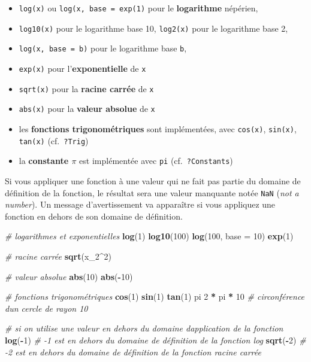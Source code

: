 \documentclass[
]{book}
\newenvironment{Shaded}{\begin{snugshade}}{\end{snugshade}}
\newcommand{\AttributeTok}[1]{\textcolor[rgb]{0.13,0.29,0.53}{#1}}
\newcommand{\CommentTok}[1]{\textcolor[rgb]{0.56,0.35,0.01}{\textit{#1}}}
\newcommand{\DecValTok}[1]{\textcolor[rgb]{0.00,0.00,0.81}{#1}}
\newcommand{\FunctionTok}[1]{\textcolor[rgb]{0.13,0.29,0.53}{\textbf{#1}}}
\newcommand{\NormalTok}[1]{#1}
\newcommand{\SpecialCharTok}[1]{\textcolor[rgb]{0.81,0.36,0.00}{\textbf{#1}}}
\providecommand{\tightlist}{%
  \setlength{\itemsep}{0pt}\setlength{\parskip}{0pt}}
\begin{document}
\begin{itemize}
\tightlist
\item
  \texttt{log(x)} ou \texttt{log(x,\ base\ =\ exp(1)} pour le \textbf{logarithme} népérien,
\item
  \texttt{log10(x)} pour le logarithme base 10, \texttt{log2(x)} pour le logarithme base 2,
\item
  \texttt{log(x,\ base\ =\ b)} pour le logarithme base \texttt{b},
\item
  \texttt{exp(x)} pour l'\textbf{exponentielle} de \texttt{x}
\item
  \texttt{sqrt(x)} pour la \textbf{racine carrée} de \texttt{x}
\item
  \texttt{abs(x)} pour la \textbf{valeur absolue} de \texttt{x}
\item
  les \textbf{fonctions trigonométriques} sont implémentées, avec \texttt{cos(x)}, \texttt{sin(x)}, \texttt{tan(x)} (cf.~\texttt{?Trig})
\item
  la \textbf{constante \(\pi\)} est implémentée avec \texttt{pi} (cf.~\texttt{?Constants})
\end{itemize}

Si vous appliquer une fonction à une valeur qui ne fait pas partie du domaine de définition de la fonction, le résultat sera une valeur manquante notée \texttt{NaN} (\emph{not a number}). Un message d'avertissement va apparaître si vous appliquez une fonction en dehors de son domaine de définition.

\begin{Shaded}
\begin{Highlighting}[]
\CommentTok{\# logarithmes et exponentielles}
\FunctionTok{log}\NormalTok{(}\DecValTok{1}\NormalTok{)}
\FunctionTok{log10}\NormalTok{(}\DecValTok{100}\NormalTok{)}
\FunctionTok{log}\NormalTok{(}\DecValTok{100}\NormalTok{, }\AttributeTok{base =} \DecValTok{10}\NormalTok{)}
\FunctionTok{exp}\NormalTok{(}\DecValTok{1}\NormalTok{)}

\CommentTok{\# racine carrée}
\FunctionTok{sqrt}\NormalTok{(x\_2}\SpecialCharTok{\^{}}\DecValTok{2}\NormalTok{)}

\CommentTok{\# valeur absolue}
\FunctionTok{abs}\NormalTok{(}\DecValTok{10}\NormalTok{)}
\FunctionTok{abs}\NormalTok{(}\SpecialCharTok{{-}}\DecValTok{10}\NormalTok{)}

\CommentTok{\# fonctions trigonométriques}
\FunctionTok{cos}\NormalTok{(}\DecValTok{1}\NormalTok{)}
\FunctionTok{sin}\NormalTok{(}\DecValTok{1}\NormalTok{)}
\FunctionTok{tan}\NormalTok{(}\DecValTok{1}\NormalTok{)}
\NormalTok{pi}
\DecValTok{2} \SpecialCharTok{*}\NormalTok{ pi }\SpecialCharTok{*} \DecValTok{10} \CommentTok{\# circonférence d\textquotesingle{}un cercle de rayon 10}

\CommentTok{\# si on utilise une valeur en dehors du domaine d\textquotesingle{}application de la fonction}
\FunctionTok{log}\NormalTok{(}\SpecialCharTok{{-}}\DecValTok{1}\NormalTok{) }\CommentTok{\# {-}1 est en dehors du domaine de définition de la fonction log}
\FunctionTok{sqrt}\NormalTok{(}\SpecialCharTok{{-}}\DecValTok{2}\NormalTok{) }\CommentTok{\# {-}2 est en dehors du domaine de définition de la fonction racine carrée}
\end{Highlighting}
\end{Shaded}
\end{document}
